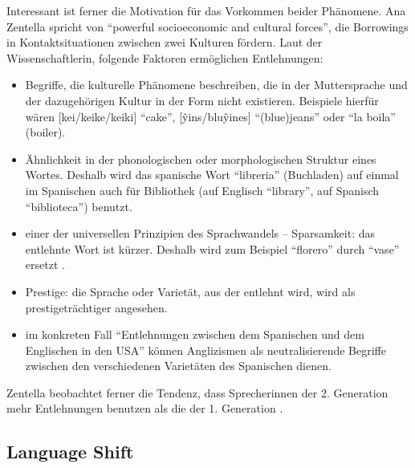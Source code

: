Interessant ist ferner die Motivation für das Vorkommen beider Phänomene.
Ana Zentella spricht von ``powerful socioeconomic and cultural forces'', die Borrowings in Kontaktsituationen zwischen zwei Kulturen fördern\cite[vgl.][]{Zentella90}.
Laut der Wissenschaftlerin, folgende Faktoren ermöglichen Entlehnungen:
\begin{itemize}
  \item Begriffe, die kulturelle Phänomene beschreiben, die in der Muttersprache und der dazugehörigen Kultur in der Form nicht existieren. Beispiele hierfür wären [kei/keike/keiki] ``cake'', [\^yins/blu\^yines] ``(blue)jeans'' \cite[vgl.][]{Zentella90} oder ``la boila'' (boiler). %
  \item Ähnlichkeit in der phonologischen oder morphologischen Struktur eines Wortes.
    Deshalb wird das spanische Wort ``libreria'' (Buchladen) auf einmal im Spanischen auch für Bibliothek (auf Englisch ``library'', auf Spanisch ``biblioteca'') benutzt. %
  \item einer der universellen Prinzipien des Sprachwandels -- Sparsamkeit: das entlehnte Wort ist kürzer. Deshalb wird zum Beispiel ``florero'' durch ``vase'' ersetzt \cite[vgl.][]{Zentella90}.
  \item Prestige: die Sprache oder Varietät, aus der entlehnt wird, wird als prestigeträchtiger angesehen.
  \item im konkreten Fall ``Entlehnungen zwischen dem Spanischen und dem Englischen in den USA'' können Anglizismen als neutralisierende Begriffe zwischen den verschiedenen Varietäten des Spanischen dienen.

\end{itemize}

Zentella beobachtet ferner die Tendenz, dass Sprecherinnen der 2. Generation mehr Entlehnungen benutzen als die der 1. Generation \cite[vgl.][]{Zentella90}.


\subsection{Language Shift}

